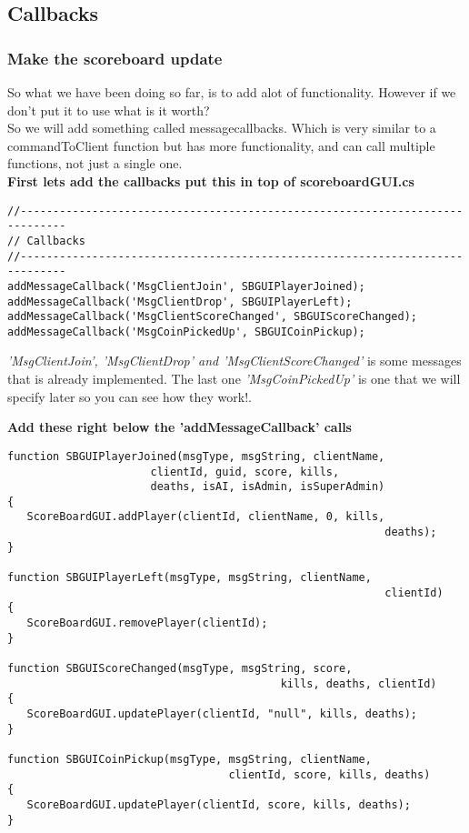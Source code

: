 \subsection{Callbacks}
\begin{frame}[fragile]
\frametitle{Make the scoreboard update}
So what we have been doing so far, is to add alot of functionality. However if we don't put it to use what is it worth?\\
So we will add something called messagecallbacks. Which is very similar to a commandToClient function but has more functionality,
and can call multiple functions, not just a single one.\\
{\bf First lets add the callbacks put this in top of scoreboardGUI.cs}
\TS
\begin{lstlisting}
//-----------------------------------------------------------------------------
// Callbacks
//-----------------------------------------------------------------------------
addMessageCallback('MsgClientJoin', SBGUIPlayerJoined);
addMessageCallback('MsgClientDrop', SBGUIPlayerLeft);
addMessageCallback('MsgClientScoreChanged', SBGUIScoreChanged);
addMessageCallback('MsgCoinPickedUp', SBGUICoinPickup);
\end{lstlisting}
{\it 'MsgClientJoin', 'MsgClientDrop' and 'MsgClientScoreChanged'} is some messages that is already implemented. The last one {\it 'MsgCoinPickedUp'} is one that we will specify later
so you can see how they work!.
\end{frame}

\begin{frame}[fragile]
{\bf Add these right below the 'addMessageCallback' calls}
\TS
\begin{lstlisting}
function SBGUIPlayerJoined(msgType, msgString, clientName, 
                      clientId, guid, score, kills, 
                      deaths, isAI, isAdmin, isSuperAdmin)
{
   ScoreBoardGUI.addPlayer(clientId, clientName, 0, kills, 
                                                          deaths);
}

function SBGUIPlayerLeft(msgType, msgString, clientName,
                                                          clientId)
{
   ScoreBoardGUI.removePlayer(clientId);
}

function SBGUIScoreChanged(msgType, msgString, score, 
                                          kills, deaths, clientId)
{
   ScoreBoardGUI.updatePlayer(clientId, "null", kills, deaths);
}

function SBGUICoinPickup(msgType, msgString, clientName, 
                                  clientId, score, kills, deaths)
{
   ScoreBoardGUI.updatePlayer(clientId, score, kills, deaths);
}
\end{lstlisting}
\end{frame}

